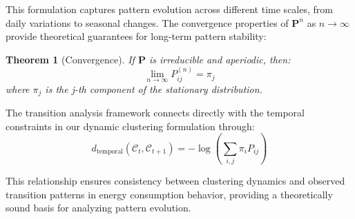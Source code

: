 \documentclass[final,5p,times,twocolumn,numbers]{elsarticle}
\newtheorem{theorem}[definition]{Theorem}
\begin{document}
This formulation captures pattern evolution across different time scales, from daily variations to seasonal changes. The convergence properties of $\mathbf{P}^n$ as $n \to \infty$ provide theoretical guarantees for long-term pattern stability:
\begin{theorem}[Convergence]
If $\mathbf{P}$ is irreducible and aperiodic, then:
\begin{equation}
    \lim_{n \to \infty} P_{ij}^{(n)} = \pi_j
\end{equation}
where $\pi_j$ is the j-th component of the stationary distribution.
\end{theorem}

The transition analysis framework connects directly with the temporal constraints in our dynamic clustering formulation through:
\begin{equation}
    d_{\text{temporal}}(\mathcal{C}_{t}, \mathcal{C}_{t+1}) = -\log\left(\sum_{i,j} \pi_i P_{ij}\right)
\end{equation}

This relationship ensures consistency between clustering dynamics and observed transition patterns in energy consumption behavior, providing a theoretically sound basis for analyzing pattern evolution.
\end{document}
